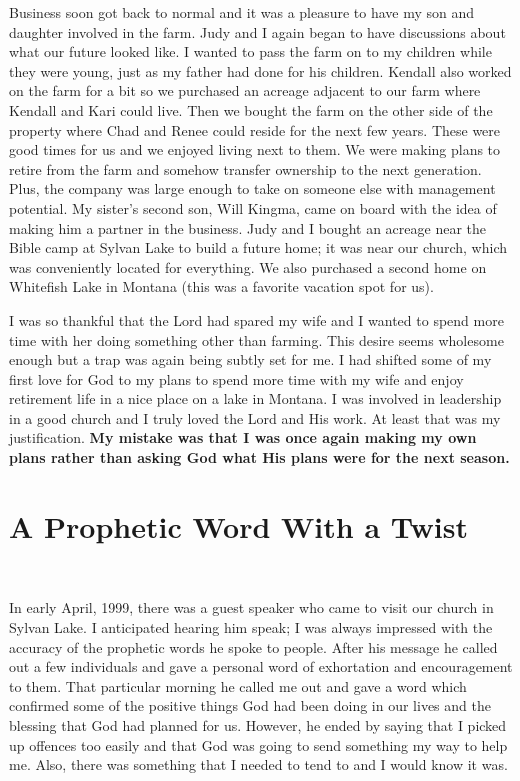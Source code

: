 \documentclass[oneside,12pt]{book}
\begin{document}
Business soon got back to normal and it was a pleasure to have my son and daughter involved  in the farm. Judy and I again began to have discussions about what our future looked like. I wanted to pass the farm on to my children while they were young, just as my father had done for his children. Kendall also worked on the farm for a bit so we purchased an acreage adjacent to our farm where Kendall and Kari could live. Then we bought the farm on the other side of the property where Chad and Renee could reside for the next few years. These were good times for us and we enjoyed living next to them. We were making plans to retire from the farm and somehow transfer ownership to the next generation. Plus, the company was large enough to take on someone else with management potential. My sister's second son, Will Kingma, came on board with the idea of making him a partner in the business. Judy and I bought an acreage near the Bible camp at Sylvan Lake to build a future home; it was near our church, which was conveniently located for everything. We also purchased a second home on Whitefish Lake in Montana (this was a favorite vacation spot for us).

I was so thankful that the Lord had spared my wife and I wanted to spend more time with her doing something other than farming. This desire seems wholesome enough but a trap was again being subtly set for me. I had shifted some of my first love for God to my plans to spend more time with my wife and enjoy retirement life in a nice place on a lake in Montana. I was involved in leadership in a good church and I truly loved the Lord and His work. At least that was my justification. \textbf{My mistake was that I was once again making my own plans rather than asking God what His plans were for the next season.}


\section{A Prophetic Word With a Twist}
\

In early April, 1999, there was a guest speaker who came to visit our church in Sylvan Lake. I anticipated hearing him speak; I was always impressed with the accuracy of the prophetic words he spoke to people. After his message he called out a few individuals and gave a personal word of exhortation and encouragement to them. That particular morning he called me out and gave a word which confirmed some of the positive things God had been doing in our lives and the blessing that God had planned for us. However, he ended by saying that I picked up offences too easily and that God was going to send something my way to help me. Also, there was something that I needed to tend to and I would know it was.
 
\end{document}
